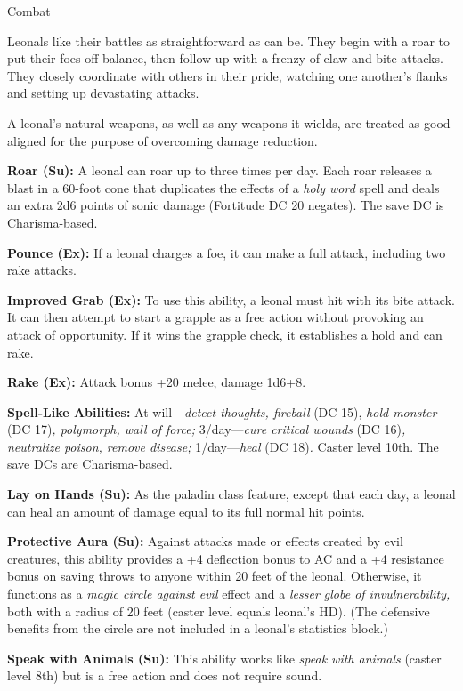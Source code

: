 \documentclass{article}
\begin{document}
Combat

Leonals like their battles as straightforward as can be. They begin with a roar 
to put their foes off balance, then follow up with a frenzy of claw and bite attacks. 
They closely coordinate with others in their pride, watching one another's flanks 
and setting up devastating attacks.

A leonal's natural weapons, as well as any weapons it wields, are treated as good-aligned 
for the purpose of overcoming damage reduction.

\textbf{Roar (Su):} A leonal can roar up to three times per day. Each roar releases 
a blast in a 60-foot cone that duplicates the effects of a \textit{holy word }spell 
and deals an extra 2d6 points of sonic damage (Fortitude DC 20 negates). The save 
DC is Charisma-based.

\textbf{Pounce (Ex):} If a leonal charges a foe, it can make a full attack, including 
two rake attacks.

\textbf{Improved Grab (Ex):} To use this ability, a leonal must hit with its bite 
attack. It can then attempt to start a grapple as a free action without provoking 
an attack of opportunity. If it wins the grapple check, it establishes a hold and 
can rake.

\textbf{Rake (Ex):} Attack bonus +20 melee, damage 1d6+8. 

\textbf{Spell-Like Abilities:} At will---\textit{detect thoughts, fireball }(DC 
15), \textit{hold monster }(DC 17)\textit{, polymorph, wall of force; }3/day---\textit{cure 
critical wounds }(DC 16)\textit{, neutralize poison, remove disease; }1/day---\textit{heal 
}(DC 18)\textit{. }Caster level 10th. The save DCs are Charisma-based.

\textbf{Lay on Hands (Su):} As the paladin class feature, except that each day, 
a leonal can heal an amount of damage equal to its full normal hit points.

\textbf{Protective Aura (Su):} Against attacks made or effects created by evil 
creatures, this ability provides a +4 deflection bonus to AC and a +4 resistance 
bonus on saving throws to anyone within 20 feet of the leonal. Otherwise, it functions 
as a \textit{magic circle against evil }effect and a \textit{lesser globe of invulnerability, 
}both with a radius of 20 feet (caster level equals leonal's HD). (The defensive 
benefits from the circle are not included in a leonal's statistics block.)

\textbf{Speak with Animals (Su):} This ability works like \textit{speak with animals 
}(caster level 8th) but is a free action and does not require sound.
\end{document}
